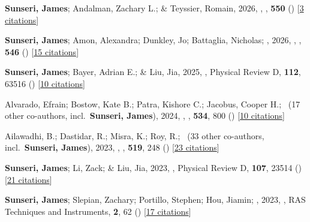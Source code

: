 \item \textbf{Sunseri, James}; Andalman, Zachary L.; \& Teyssier, Romain, 2026, , \mnras, \textbf{550} () [\href{https://ui.adsabs.harvard.edu/abs/2026MNRAS.550g1129S}{3 citations}]

\item \textbf{Sunseri, James}; Amon, Alexandra; Dunkley, Jo; Battaglia, Nicholas; \etal, 2026, , \mnras, \textbf{546} () [\href{https://ui.adsabs.harvard.edu/abs/2026MNRAS.546ag031S}{15 citations}]

\item \textbf{Sunseri, James}; Bayer, Adrian E.; \& Liu, Jia, 2025, , Physical Review D, \textbf{112}, 63516 () [\href{https://ui.adsabs.harvard.edu/abs/2025PhRvD.112f3516S}{10 citations}]

\item Alvarado, Efrain; Bostow, Kate B.; Patra, Kishore C.; Jacobus, Cooper H.; \etal\ ({17} other co-authors, incl.\ \textbf{Sunseri, James}), 2024, , \mnras, \textbf{534}, 800 () [\href{https://ui.adsabs.harvard.edu/abs/2024MNRAS.534..800A}{10 citations}]

\item Ailawadhi, B.; Dastidar, R.; Misra, K.; Roy, R.; \etal\ ({33} other co-authors, incl.\ \textbf{Sunseri, James}), 2023, , \mnras, \textbf{519}, 248 () [\href{https://ui.adsabs.harvard.edu/abs/2023MNRAS.519..248A}{23 citations}]

\item \textbf{Sunseri, James}; Li, Zack; \& Liu, Jia, 2023, , Physical Review D, \textbf{107}, 23514 () [\href{https://ui.adsabs.harvard.edu/abs/2023PhRvD.107b3514S}{21 citations}]

\item \textbf{Sunseri, James}; Slepian, Zachary; Portillo, Stephen; Hou, Jiamin; \etal, 2023, , RAS Techniques and Instruments, \textbf{2}, 62 () [\href{https://ui.adsabs.harvard.edu/abs/2023RASTI...2...62S}{17 citations}]

